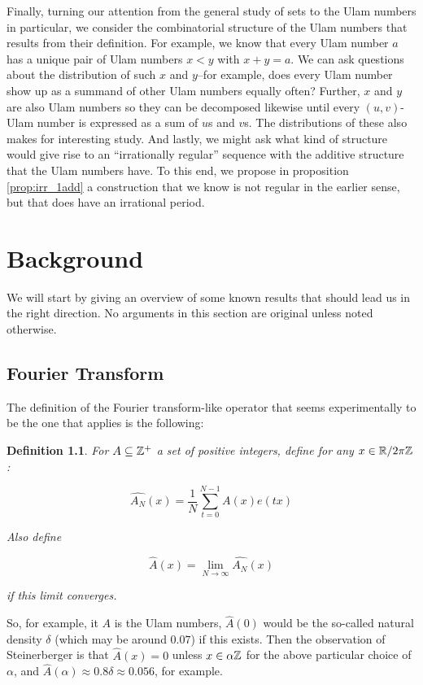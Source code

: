 \documentclass{report}
\newtheorem{definition}[theorem]{Definition}
\theoremstyle{remark}
\numberwithin{equation}{section}
\begin{document}
Finally, turning our attention from the general study of \relevant
sets to the Ulam numbers in particular, we consider the combinatorial
structure of the Ulam numbers that results from their definition.  For
example, we know that every Ulam number $a$ has a unique pair of Ulam
numbers $x < y$ with $x + y = a$.  We can ask questions about the
distribution of such $x$ and $y$--for example, does every Ulam number
show up as a summand of other Ulam numbers equally often?  Further,
$x$ and $y$ are also Ulam numbers so they can be decomposed likewise
until every $(u,v)$-Ulam number is expressed as a sum of $u$s and
$v$s.  The distributions of these also makes for interesting study.
And lastly, we might ask what kind of structure would give rise to an
``irrationally regular'' sequence with the additive structure that the
Ulam numbers have.  To this end, we propose in proposition
\ref{prop:irr_1add} a construction that we know is not regular in the
earlier sense, but that does have an irrational period.

\chapter{Background}

We will start by giving an overview of some known results that should
lead us in the right direction.  No arguments in this section are
original unless noted otherwise.

\section{Fourier Transform}

The definition of the Fourier transform-like operator that seems
experimentally to be the one that applies is the following:

\begin{definition}
For $A \subseteq \mathbb{Z}^+$ a set of positive integers, define for any
$x\in \mathbb{R}/2\pi\mathbb{Z}$: 

\[\widehat{A_N}(x) = \frac{1}{N} \sum_{t=0}^{N-1} A(x) e(tx)\]

Also define 

\[\widehat{A}(x) = \lim_{N \to \infty} \widehat{A_N}(x)\]

if this limit converges.  
\end{definition}

So, for example, it $A$ is the Ulam numbers, $\widehat{A}(0)$ would be
the so-called natural density $\delta$ (which may be around $0.07$) if
this exists.  Then the observation of Steinerberger is that
$\widehat{A}(x) = 0$ unless $x \in \alpha\mathbb{Z}$ for the above particular
choice of $\alpha$, and
$\widehat{A}(\alpha) \approx 0.8\delta \approx 0.056$, for example.
\end{document}
